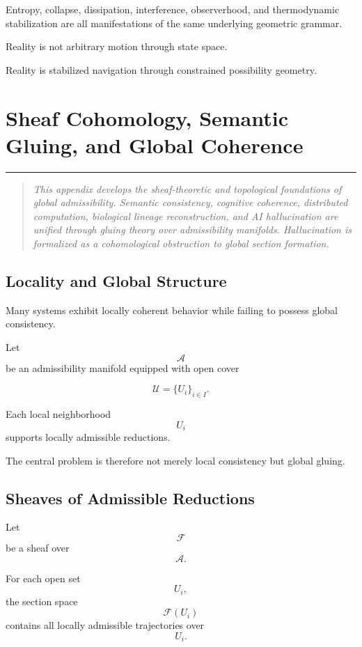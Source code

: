 \documentclass[12pt,openany]{book}
\theoremstyle{plain}
\theoremstyle{definition}
\theoremstyle{remark}
\newcommand{\chapterrule}{%
  \vspace{4pt}%
  {\color{SpherepopBlue}\rule{\textwidth}{0.8pt}}%
  \vspace{10pt}%
}
\newenvironment{chapterprecis}{%
  \begin{quote}\small\itshape}{%
  \end{quote}\medskip}
\begin{document}
Entropy, collapse, dissipation, interference, observerhood,
and thermodynamic stabilization are all manifestations of the
same underlying geometric grammar.

Reality is not arbitrary motion through state space.

Reality is stabilized navigation through constrained possibility
geometry.


\chapter{Sheaf Cohomology, Semantic Gluing, and Global Coherence}
\chapterrule

\begin{chapterprecis}
This appendix develops the sheaf-theoretic and topological
foundations of global admissibility. Semantic consistency,
cognitive coherence, distributed computation, biological lineage
reconstruction, and AI hallucination are unified through gluing
theory over admissibility manifolds. Hallucination is formalized
as a cohomological obstruction to global section formation.
\end{chapterprecis}

\section{Locality and Global Structure}

Many systems exhibit locally coherent behavior while failing to
possess global consistency.

Let
\[
\mathcal{A}
\]
be an admissibility manifold equipped with open cover

\[
\mathcal{U}
=
\{U_i\}_{i\in I}.
\]

Each local neighborhood
\[
U_i
\]
supports locally admissible reductions.

The central problem is therefore not merely local consistency but
global gluing.

\section{Sheaves of Admissible Reductions}

Let
\[
\mathcal{F}
\]
be a sheaf over
\[
\mathcal{A}.
\]

For each open set
\[
U_i,
\]
the section space
\[
\mathcal{F}(U_i)
\]
contains all locally admissible trajectories over
\[
U_i.
\]
\end{document}
